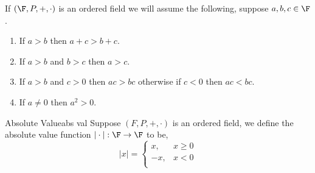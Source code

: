 \documentclass{report}
\begin{document}
\begin{fact}{}{}
  If $\left(\F, P, +, \cdot \right)$ is an ordered field we will assume the following,
  suppose $a,b,c \in \F$.
  \begin{enumerate}
    \item If $a > b$ then $a + c > b + c$.
    \item If $a > b$ and $b > c$ then $a > c$.
    \item If $a > b$ and $c > 0$ then $ac > bc$ otherwise if $c < 0$ then $ac < bc$.
    \item If $a \neq 0$ then $a^2 > 0$.
  \end{enumerate}
\end{fact}

\begin{definition}{Absolute Value}{abs val}
  Suppose $\left(F, P, +, \cdot\right)$ is an ordered field, we define the absolute value function $|\cdot|: \F \rightarrow \F$ to be,
  $$|x| = \begin{cases}
      x,  & x \geq 0 \\
      -x, & x < 0    \\
    \end{cases}$$
\end{definition}
\end{document}
